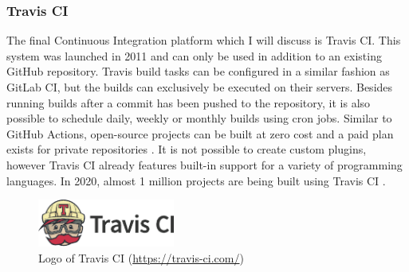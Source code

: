 
\subsubsection{Travis CI}
The final Continuous Integration platform which I will discuss is Travis CI. This \CI{} system was launched in 2011 and can only be used in addition to an existing GitHub repository. Travis build tasks can be configured in a similar fashion as GitLab CI, but the builds can exclusively be executed on their servers. Besides running builds after a commit has been pushed to the repository, it is also possible to schedule daily, weekly or monthly builds using cron jobs. Similar to GitHub Actions, open-source projects can be built at zero cost and a paid plan exists for private repositories \cite{travisanalysis}. It is not possible to create custom plugins, however Travis CI already features built-in support for a variety of programming languages. In 2020, almost 1 million projects are being built using Travis CI \cite{travis2020}.

\begin{figure}[htbp!]
	\centering
	\includegraphics[width=0.40\textwidth]{assets/images/travis-ci.pdf}
	\caption{Logo of Travis CI (\url{https://travis-ci.com/})}
	\label{fig:travis-ci}
\end{figure}

